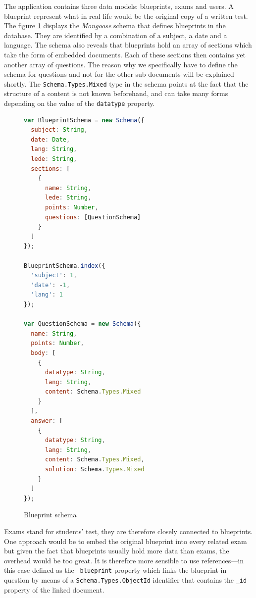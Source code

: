 \documentclass[thesis=M,english,hidelinks]{FITthesis}[2012/10/20]
\newcommand{\code}{\texttt}
\begin{document}
The application contains three data models: blueprints, exams and users. A blueprint represent what in real life would be the original copy of a written test. The figure \ref{fig:blueprint_schema} displays the \textit{Mongoose} schema that defines blueprints in the database. They are identified by a combination of a subject, a date and a language. The schema also reveals that blueprints hold an array of sections which take the form of embedded documents. Each of these sections then contains yet another array of questions. The reason why we specifically have to define the schema for questions and not for the other sub-documents will be explained shortly. The \code{Schema.Types.Mixed} type in the schema points at the fact that the structure of a content is not known beforehand, and can take many forms depending on the value of the \code{datatype} property.

\begin{figure}
  \begin{lstlisting}[language=JavaScript]
var BlueprintSchema = new Schema({
  subject: String,
  date: Date,
  lang: String,
  lede: String,
  sections: [
    {
      name: String,
      lede: String,
      points: Number,
      questions: [QuestionSchema]
    }
  ]
});

BlueprintSchema.index({
  'subject': 1,
  'date': -1,
  'lang': 1
});

var QuestionSchema = new Schema({
  name: String,
  points: Number,
  body: [
    {
      datatype: String,
      lang: String,
      content: Schema.Types.Mixed
    }
  ],
  answer: [
    {
      datatype: String,
      lang: String,
      content: Schema.Types.Mixed,
      solution: Schema.Types.Mixed
    }
  ]
});
  \end{lstlisting}
  \caption{Blueprint schema}
  \label{fig:blueprint_schema}
\end{figure}

Exams stand for students' test, they are therefore closely connected to blueprints. One approach would be to embed the original blueprint into every related exam but given the fact that blueprints usually hold more data than exams, the overhead would be too great. It is therefore more sensible to use references---in this case defined as the \code{\_blueprint} property which links the blueprint in question by means of a \code{Schema.Types.ObjectId} identifier that contains the \code{\_id} property of the linked document.
\end{document}
